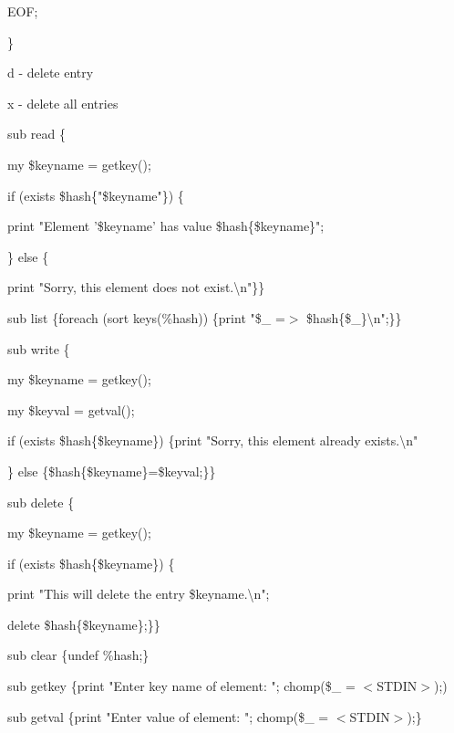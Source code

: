 \documentclass[a4paper,11pt]{book}
\begin{document}
\noindent 

\noindent EOF;

\noindent \}

\noindent d - delete entry

\noindent x - delete all entries

\noindent 

\noindent sub read \{

\noindent my \$keyname = getkey();

\noindent 

\noindent if (exists \$hash\{"\$keyname"\}) \{

\noindent print "Element '\$keyname' has value \$hash\{\$keyname\}";

\noindent \} else \{

\noindent print "Sorry, this element does not exist.\textbackslash n"\}\}

\noindent 

\noindent sub list \{foreach (sort keys(\%hash)) \{print "\$\_ =$>$ \$hash\{\$\_\}\textbackslash n";\}\}

\noindent 

\noindent sub write \{

\noindent my \$keyname = getkey();

\noindent my \$keyval = getval();

\noindent if (exists \$hash\{\$keyname\}) \{print "Sorry, this element already exists.\textbackslash n"

\noindent \} else \{\$hash\{\$keyname\}=\$keyval;\}\}

\noindent 

\noindent sub delete \{

\noindent my \$keyname = getkey();

\noindent if (exists \$hash\{\$keyname\}) \{

\noindent print "This will delete the entry \$keyname.\textbackslash n";

\noindent delete \$hash\{\$keyname\};\}\}

\noindent 

\noindent sub clear \{undef \%hash;\}

\noindent 

\noindent sub getkey \{print "Enter key name of element: "; chomp(\$\_ = $<$STDIN$>$);)

\noindent 

\noindent sub getval \{print "Enter value of element: "; chomp(\$\_ = $<$STDIN$>$);\}

\noindent  
\end{document}
